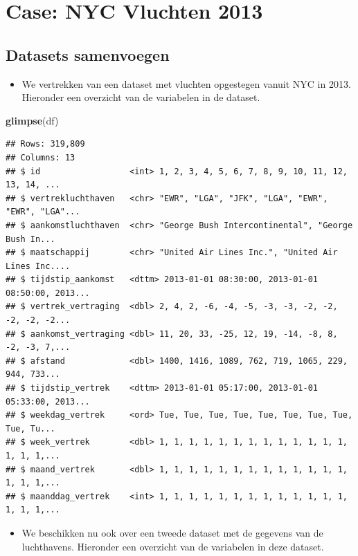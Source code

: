 \documentclass[]{tufte-book}
\newenvironment{Shaded}{}{}
\newcommand{\KeywordTok}[1]{\textcolor[rgb]{0.00,0.44,0.13}{\textbf{#1}}}
\newcommand{\NormalTok}[1]{#1}
\providecommand{\tightlist}{%
  \setlength{\itemsep}{0pt}\setlength{\parskip}{0pt}}
\begin{document}
\hypertarget{case-nyc-vluchten-2013}{%
\section{Case: NYC Vluchten 2013}\label{case-nyc-vluchten-2013}}

\hypertarget{datasets-samenvoegen}{%
\subsection{Datasets samenvoegen}\label{datasets-samenvoegen}}

\begin{itemize}
\tightlist
\item
  We vertrekken van een dataset met vluchten opgestegen vanuit NYC in 2013. Hieronder een overzicht van de variabelen in de dataset.
\end{itemize}

\begin{Shaded}
\begin{Highlighting}[]
\KeywordTok{glimpse}\NormalTok{(df)}
\end{Highlighting}
\end{Shaded}

\begin{verbatim}
## Rows: 319,809
## Columns: 13
## $ id                  <int> 1, 2, 3, 4, 5, 6, 7, 8, 9, 10, 11, 12, 13, 14, ...
## $ vertrekluchthaven   <chr> "EWR", "LGA", "JFK", "LGA", "EWR", "EWR", "LGA"...
## $ aankomstluchthaven  <chr> "George Bush Intercontinental", "George Bush In...
## $ maatschappij        <chr> "United Air Lines Inc.", "United Air Lines Inc....
## $ tijdstip_aankomst   <dttm> 2013-01-01 08:30:00, 2013-01-01 08:50:00, 2013...
## $ vertrek_vertraging  <dbl> 2, 4, 2, -6, -4, -5, -3, -3, -2, -2, -2, -2, -2...
## $ aankomst_vertraging <dbl> 11, 20, 33, -25, 12, 19, -14, -8, 8, -2, -3, 7,...
## $ afstand             <dbl> 1400, 1416, 1089, 762, 719, 1065, 229, 944, 733...
## $ tijdstip_vertrek    <dttm> 2013-01-01 05:17:00, 2013-01-01 05:33:00, 2013...
## $ weekdag_vertrek     <ord> Tue, Tue, Tue, Tue, Tue, Tue, Tue, Tue, Tue, Tu...
## $ week_vertrek        <dbl> 1, 1, 1, 1, 1, 1, 1, 1, 1, 1, 1, 1, 1, 1, 1, 1,...
## $ maand_vertrek       <dbl> 1, 1, 1, 1, 1, 1, 1, 1, 1, 1, 1, 1, 1, 1, 1, 1,...
## $ maanddag_vertrek    <int> 1, 1, 1, 1, 1, 1, 1, 1, 1, 1, 1, 1, 1, 1, 1, 1,...
\end{verbatim}

\begin{itemize}
\tightlist
\item
  We beschikken nu ook over een tweede dataset met de gegevens van de luchthavens. Hieronder een overzicht van de variabelen in deze dataset.
\end{itemize}
\end{document}
